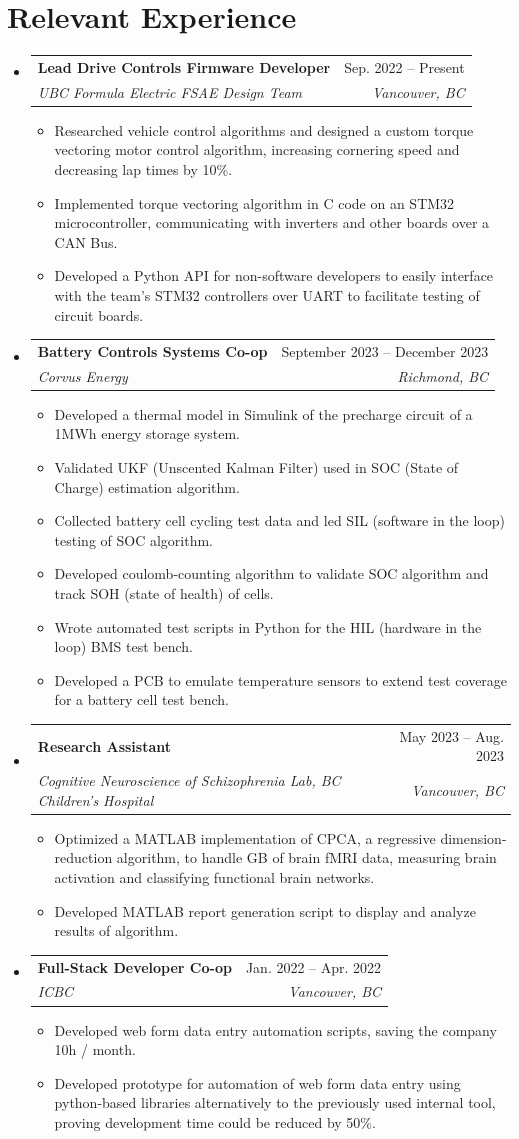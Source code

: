 \documentclass[letterpaper,11pt]{article}
\makeatletter
\newcommand{\resumeItem}[1]{
  \item\small{
    {#1 \vspace{-2pt}}
  }
}
\newcommand{\resumeSubheading}[4]{
  \vspace{-2pt}\item
    \begin{tabular*}{0.97\textwidth}[t]{l@{\extracolsep{\fill}}r}
      \textbf{#1} & #2 \\
      \textit{\small#3} & \textit{\small #4} \\
    \end{tabular*}\vspace{-7pt}
}
\newcommand{\resumeSubHeadingListStart}{\begin{itemize}[leftmargin=0.15in, label={}]}
\newcommand{\resumeSubHeadingListEnd}{\end{itemize}}
\newcommand{\resumeItemListStart}{\begin{itemize}}
\newcommand{\resumeItemListEnd}{\end{itemize}\vspace{-5pt}}
\makeatother
\begin{document}
\section{Relevant Experience}
  \resumeSubHeadingListStart
  \resumeSubheading
      {Lead Drive Controls Firmware Developer}{Sep. 2022 -- Present}
      {UBC Formula Electric FSAE Design Team}{Vancouver, BC}
      \resumeItemListStart
        \resumeItem{Researched vehicle control algorithms and designed a custom torque vectoring motor control algorithm, increasing cornering speed and decreasing lap times by 10\%.}
        \resumeItem{Implemented torque vectoring algorithm in C code on an STM32 microcontroller, communicating with inverters and other boards over a CAN Bus.}
        \resumeItem{Developed a Python API for non-software developers to easily interface with the team's STM32 controllers over UART to facilitate testing of circuit boards.}
      \resumeItemListEnd
    \resumeSubheading
      {Battery Controls Systems Co-op}{September 2023 -- December 2023}
      {Corvus Energy}{Richmond, BC}
      \resumeItemListStart
        \resumeItem{Developed a thermal model in Simulink of the precharge circuit of a 1MWh energy storage system.}
        \resumeItem{Validated UKF (Unscented Kalman Filter) used in SOC (State of Charge) estimation algorithm.}
        \resumeItem{Collected battery cell cycling test data and led SIL (software in the loop) testing of SOC algorithm.} 
        \resumeItem{Developed coulomb-counting algorithm to validate SOC algorithm and track SOH (state of health) of cells.}
        \resumeItem{Wrote automated test scripts in Python for the HIL (hardware in the loop) BMS test bench.}
        \resumeItem{Developed a PCB to emulate temperature sensors to extend test coverage for a battery cell test bench.}
      \resumeItemListEnd
    \resumeSubheading
      {Research Assistant}{May 2023 -- Aug. 2023}
      {Cognitive Neuroscience of Schizophrenia Lab, BC Children's Hospital}{Vancouver, BC}
      \resumeItemListStart
        \resumeItem{Optimized a MATLAB implementation of CPCA, a regressive dimension-reduction algorithm, to handle GB of brain fMRI data, measuring brain activation and classifying functional brain networks.}
        \resumeItem{Developed MATLAB report generation script to display and analyze results of algorithm. }
      \resumeItemListEnd
  \resumeSubheading
      {Full-Stack Developer Co-op}{Jan. 2022 -- Apr. 2022}
      {ICBC}{Vancouver, BC}
      \resumeItemListStart
        \resumeItem{Developed web form data entry automation scripts, saving the company 10h / month.}
        \resumeItem{Developed prototype for automation of web form data entry using python-based libraries alternatively to the previously used internal tool, 
        proving development time could be reduced by 50\%.}
      \resumeItemListEnd
  \resumeSubHeadingListEnd
\end{document}
